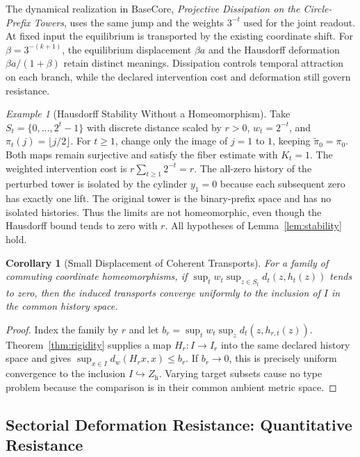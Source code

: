 \documentclass[11pt,a4paper]{article}
\theoremstyle{plain}
\newtheorem{corollary}[theorem]{Corollary}
\theoremstyle{definition}
\theoremstyle{remark}
\newtheorem{example}[theorem]{Example}
\begin{document}
The dynamical realization in BaseCore, \emph{Projective Dissipation on the Circle-Prefix Towers}, uses the same jump and the weights $3^{-t}$ used for the joint readout. At fixed input the equilibrium is transported by the existing coordinate shift. For $\beta=3^{-(k+1)}$, the equilibrium displacement $\beta a$ and the Hausdorff deformation $\beta a/(1+\beta)$ retain distinct meanings. Dissipation controls temporal attraction on each branch, while the declared intervention cost and deformation still govern resistance.


\begin{example}[Hausdorff Stability Without a Homeomorphism]\label{ex:hausdorff-not-isomorphism}
Take $S_t=\{0,\ldots,2^t-1\}$ with discrete distance scaled by $r>0$, $w_t=2^{-t}$, and $\pi_t(j)=\lfloor j/2\rfloor$. For $t\geq1$, change only the image of $j=1$ to $1$, keeping $\widetilde\pi_0=\pi_0$. Both maps remain surjective and satisfy the fiber estimate with $K_t=1$. The weighted intervention cost is $r\sum_{t\geq1}2^{-t}=r$. The all-zero history of the perturbed tower is isolated by the cylinder $y_1=0$ because each subsequent zero has exactly one lift. The original tower is the binary-prefix space and has no isolated histories. Thus the limits are not homeomorphic, even though the Hausdorff bound tends to zero with $r$. All hypotheses of Lemma~\ref{lem:stability} hold.
\end{example}

\begin{corollary}[Small Displacement of Coherent Transports]
For a family of commuting coordinate homeomorphisms, if $\sup_t w_t\sup_{z\in S_t}d_t(z,h_t(z))$ tends to zero, then the induced transports converge uniformly to the inclusion of $I$ in the common history space.
\end{corollary}
\begin{proof}
Index the family by $r$ and let $b_r=\sup_t w_t\sup_z d_t(z,h_{r,t}(z))$.
Theorem~\ref{thm:rigidity} supplies a map $H_r:I\to I_r$ into the same
declared history space and gives $\sup_{x\in I}d_w(H_rx,x)\leq b_r$.
If $b_r\to0$, this is precisely uniform convergence to the inclusion
$I\hookrightarrow Z_{\mathrm h}$. Varying target subsets cause no type
problem because the comparison is in their common ambient metric space.
\end{proof}


\subsection{Sectorial Deformation Resistance: Quantitative Resistance}
\end{document}
